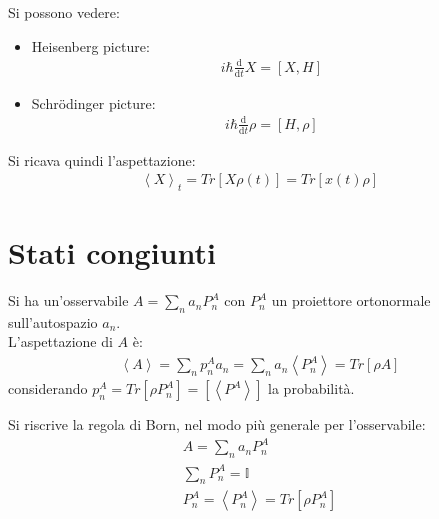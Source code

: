 Si possono vedere:
\begin{itemize}
\item Heisenberg picture:
\begin{equation}\begin{split}
i\hbar \frac{\textrm{d}}{\textrm{d}t}X=\left[X,H\right]
\end{split}\end{equation}
\item Schrödinger picture:
\begin{equation}\begin{split}
i\hbar \frac{\textrm{d}}{\textrm{d}t}\rho=\left[H,\rho\right]
\end{split}\end{equation}
\end{itemize}

Si ricava quindi l'aspettazione:
\begin{equation}\begin{split}
\left\langle X \right\rangle_t=Tr\left[X\rho\left(t\right)\right]=Tr\left[x\left(t\right)\rho\right]
\end{split}\end{equation}

\section{Stati congiunti} %
Si ha un'osservabile $A=\sum_n{a_nP_n^A}$ con $P_n^A$ un proiettore ortonormale sull'autospazio $a_n$. \\L'aspettazione di $A$ è:
\begin{equation}\begin{split}
\left\langle A \right\rangle=\sum_n{p_n^Aa_n}=\sum_n{a_n\left\langle P^A_n \right\rangle}=Tr\left[\rho A\right]
\end{split}\end{equation}
considerando $p_n^A=Tr\left[\rho P_n^A\right]=\left[\left\langle P^A \right\rangle\right]$ la probabilità.

Si riscrive la regola di Born, nel modo più generale per l'osservabile:
\begin{equation}\begin{split}
A=\sum_n{a_nP_n^A} \\
\sum_n{P_n^A}=\mathbb{I} \\
P_n^A=\left\langle P_n^A \right\rangle=Tr\left[\rho P_n^A\right]
\end{split}\end{equation}

